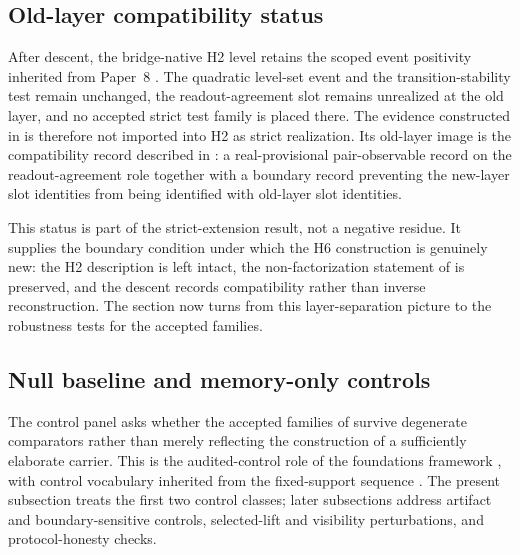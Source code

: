 \documentclass[11pt]{article}
\newcommand{\OldLayer}{H2}
\newcommand{\NewLayer}{H6}
\newcommand{\PaperEight}{Paper~8}
\theoremstyle{definition}
\begin{document}
\subsection{Old-layer compatibility status}\label{subsec:old-h2-compatibility-status}

After descent, the bridge-native \OldLayer{} level retains the scoped event
positivity inherited from \PaperEight{} \cite{Tsiokos2026CarrierToEvent}.  The
quadratic level-set event and the transition-stability test remain unchanged,
the readout-agreement slot remains unrealized at the old layer, and no accepted
strict test family is placed there.  The evidence constructed in
 is therefore not imported into \OldLayer{} as strict
realization.  Its old-layer image is the compatibility record described in
: a real-provisional pair-observable record on the
readout-agreement role together with a boundary record preventing the new-layer
slot identities from being identified with old-layer slot identities.

This status is part of the strict-extension result, not a negative residue.  It
supplies the boundary condition under which the \NewLayer{} construction is
genuinely new: the \OldLayer{} description is left intact, the
non-factorization statement of  is
preserved, and the descent records compatibility rather than inverse
reconstruction.  The section now turns from this layer-separation picture to
the robustness tests for the accepted families.

\subsection{Null baseline and memory-only controls}\label{subsec:control-panel-null-memory}

The control panel asks whether the accepted families of
 survive degenerate comparators
rather than merely reflecting the construction of a sufficiently elaborate
carrier.  This is the audited-control role of the foundations framework
\cite{Tsiokos2026FoundationsII}, with control vocabulary inherited from the
fixed-support sequence \cite{Tsiokos2026CarrierToEvent,Tsiokos2026PromotionCriteria}.
The present subsection treats the first two control classes; later subsections
address artifact and boundary-sensitive controls, selected-lift and visibility
perturbations, and protocol-honesty checks.
\end{document}

